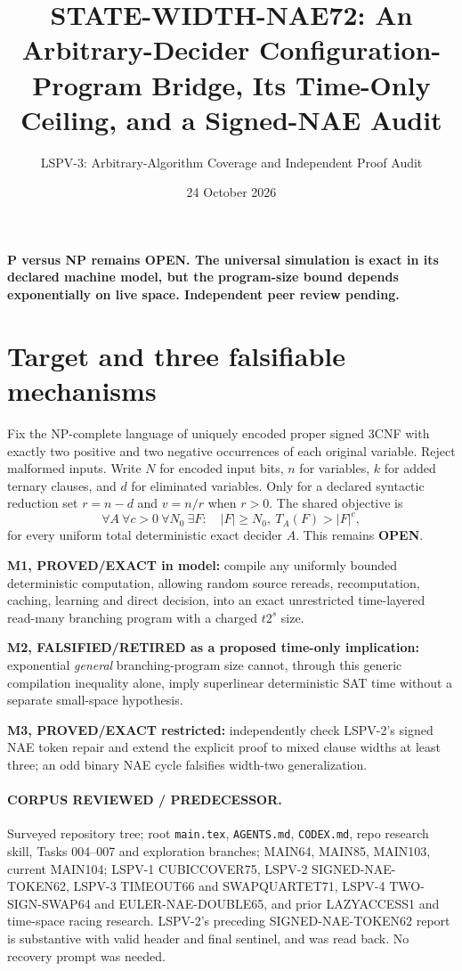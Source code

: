 \documentclass[11pt]{article}
\title{STATE-WIDTH-NAE72: An Arbitrary-Decider Configuration-Program Bridge, Its Time-Only Ceiling, and a Signed-NAE Audit}
\author{LSPV-3: Arbitrary-Algorithm Coverage and Independent Proof Audit}
\date{24 October 2026}
\newcommand{\OPEN}{\textbf{OPEN}}
\begin{document}
\maketitle
\begin{center}
\textbf{P versus NP remains OPEN. The universal simulation is exact in its declared machine model, but the program-size bound depends exponentially on live space. Independent peer review pending.}
\end{center}

\section{Target and three falsifiable mechanisms}
Fix the NP-complete language of uniquely encoded proper signed 3CNF with exactly two positive and two negative occurrences of each original variable. Reject malformed inputs. Write $N$ for encoded input bits, $n$ for variables, $k$ for added ternary clauses, and $d$ for eliminated variables. Only for a declared syntactic reduction set $r=n-d$ and $v=n/r$ when $r>0$. The shared objective is
\[
\forall A\ \forall c>0\ \forall N_0\ \exists F:\quad
|F|\ge N_0,\ T_A(F)>|F|^c, \tag{1}
\]
for every uniform total deterministic exact decider $A$. This remains \OPEN.

\noindent \textbf{M1, PROVED/EXACT in model:} compile any uniformly bounded deterministic computation, allowing random source rereads, recomputation, caching, learning and direct decision, into an exact unrestricted time-layered read-many branching program with a charged $t2^s$ size.
\par\noindent \textbf{M2, FALSIFIED/RETIRED as a proposed time-only implication:} exponential \emph{general} branching-program size cannot, through this generic compilation inequality alone, imply superlinear deterministic SAT time without a separate small-space hypothesis.
\par\noindent \textbf{M3, PROVED/EXACT restricted:} independently check LSPV-2's signed NAE token repair and extend the explicit proof to mixed clause widths at least three; an odd binary NAE cycle falsifies width-two generalization.

\paragraph{CORPUS REVIEWED / PREDECESSOR.}
Surveyed repository tree; root \texttt{main.tex}, \texttt{AGENTS.md}, \texttt{CODEX.md}, repo research skill, Tasks 004--007 and exploration branches; MAIN64, MAIN85, MAIN103, current MAIN104; LSPV-1 CUBICCOVER75, LSPV-2 SIGNED-NAE-TOKEN62, LSPV-3 TIMEOUT66 and SWAPQUARTET71, LSPV-4 TWO-SIGN-SWAP64 and EULER-NAE-DOUBLE65, and prior LAZYACCESS1 and time-space racing research. LSPV-2's preceding SIGNED-NAE-TOKEN62 report is substantive with valid header and final sentinel, and was read back. No recovery prompt was needed.
\end{document}
